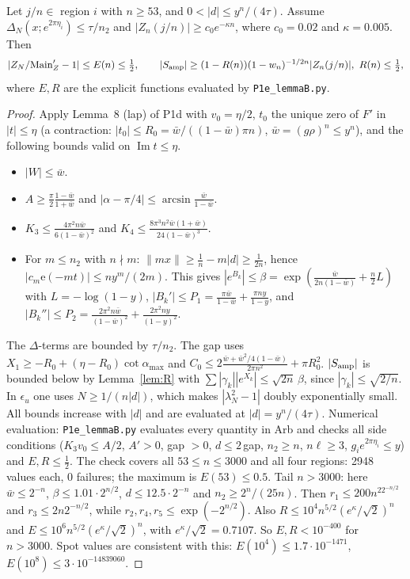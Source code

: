 \documentclass[11pt]{article}
\theoremstyle{definition}\newtheorem{definition}[theorem]{Definition}
\theoremstyle{remark}\newtheorem{remark}[theorem]{Remark}
\newcommand{\e}{\mathrm{e}}
\begin{document}
\begin{lemma}\label{lem:B}
Let $j/n\in$ region $i$ with $n\ge53$, and $0<|d|\le y^n/(4\tau)$. Assume $\Delta_N(x;e^{2\pi\eta_i})\le\tau/n_2$ and $|Z_n(j/n)|\ge c_0e^{-\kappa n}$, where $c_0=0.02$ and $\kappa=0.005$. Then
\[|Z_N/\mathrm{Main}'_Z-1|\le E(n)\le\tfrac12,\qquad |S_{\rm amp}|\ge(1-R(n))(1-w_n)^{-1/2n}|Z_n(j/n)|,\ R(n)\le\tfrac12,\]
where $E,R$ are the explicit functions evaluated by \texttt{P1e\_lemmaB.py}.
\end{lemma}
\begin{proof}
Apply Lemma~8 (lap) of P1d with $v_0=\eta/2$, $t_0$ the unique zero of $F'$ in $|t|\le\eta$ (a contraction: $|t_0|\le R_0=\bar w/((1-\bar w)\pi n)$, $\bar w=(g\rho)^n\le y^n$), and the following bounds valid on $\operatorname{Im}t\le\eta$.
\begin{itemize}
\item $|W|\le\bar w$.
\item $A\ge\frac\pi2\frac{1-\bar w}{1+\bar w}$ and $|\alpha-\pi/4|\le\arcsin\frac{\bar w}{1-\bar w}$.
\item $K_3\le\frac{4\pi^2n\bar w}{6(1-\bar w)^2}$ and $K_4\le\frac{8\pi^3n^2\bar w(1+\bar w)}{24(1-\bar w)^3}$.
\item For $m\le n_2$ with $n\nmid m$: $\|mx\|\ge\frac1n-m|d|\ge\frac1{2n}$, hence $|c_m\e(-mt)|\le ny^m/(2m)$. This gives $|e^{B_k}|\le\beta=\exp(\frac{\bar w}{2n(1-\bar w)}+\frac n2L)$ with $L=-\log(1-y)$, $|B_k'|\le P_1=\frac{\pi\bar w}{1-\bar w}+\frac{\pi ny}{1-y}$, and $|B_k''|\le P_2=\frac{2\pi^2n\bar w}{(1-\bar w)^2}+\frac{2\pi^2ny}{(1-y)^2}$.
\end{itemize}
The $\Delta$-terms are bounded by $\tau/n_2$. The gap uses $X_1\ge-R_0+(\eta-R_0)\cot\alpha_{\max}$ and $C_0\le2\frac{\bar w+\bar w^2/4(1-\bar w)}{2\pi n^2}+\pi R_0^2$.
$|S_{\rm amp}|$ is bounded below by Lemma~\ref{lem:R} with $\sum|\gamma_k||e^{X_k}|\le\sqrt{2n}\,\beta$, since $|\gamma_k|\le\sqrt{2/n}$. In $\epsilon_u$ one uses $N\ge1/(n|d|)$, which makes $|\lambda_N^2-1|$ doubly exponentially small.
All bounds increase with $|d|$ and are evaluated at $|d|=y^n/(4\tau)$.
Numerical evaluation: \texttt{P1e\_lemmaB.py} evaluates every quantity in Arb and checks all side conditions ($K_3v_0\le A/2$, $A'>0$, gap $>0$, $d\le2\,$gap, $n_2\ge n$, $n\ell\ge3$, $g_ie^{2\pi\eta_i}\le y$) and $E,R\le\frac12$. The check covers all $53\le n\le3000$ and all four regions: 2948 values each, 0 failures; the maximum is $E(53)\le0.5$.
Tail $n>3000$: here $\bar w\le2^{-n}$, $\beta\le1.01\cdot2^{n/2}$, $d\le12.5\cdot2^{-n}$ and $n_2\ge2^n/(25n)$. Then $r_1\le200n^22^{-n/2}$ and $r_3\le2n2^{-n/2}$, while $r_2,r_4,r_5\le\exp(-2^{n/2})$. Also $R\le10^4n^{5/2}(e^{\kappa}/\sqrt2)^n$ and $E\le10^6n^{5/2}(e^\kappa/\sqrt2)^n$, with $e^{\kappa}/\sqrt2=0.7107$. So $E,R<10^{-400}$ for $n>3000$.
Spot values are consistent with this: $E(10^4)\le1.7\cdot10^{-1471}$, $E(10^8)\le3\cdot10^{-14839060}$.
\end{proof}
\end{document}
